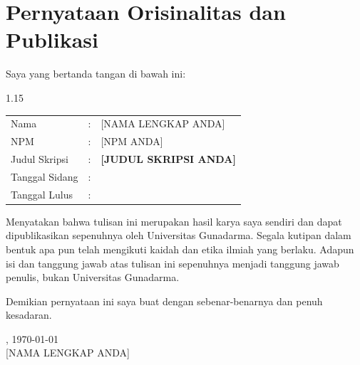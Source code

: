 \section*{Pernyataan Orisinalitas dan Publikasi}
\thispagestyle{plain}

\justify
Saya yang bertanda tangan di bawah ini:

\vspace{0.5cm}

\begin{spacing}{1.15}
	\begin{tabular}{p{4.5cm} cp{9cm}}
		Nama           & : & [NAMA LENGKAP ANDA]                                                                                                                           \\
		NPM            & : & [NPM ANDA]                                                                                                                                   \\
		Judul Skripsi  & : & \textbf{[JUDUL SKRIPSI ANDA]} \\
		Tanggal Sidang & : &                                                                                                                                            \\
		Tanggal Lulus  & : &                                                                                                                                            \\
	\end{tabular}
\end{spacing}

\vspace{0.5cm}

Menyatakan bahwa tulisan ini merupakan hasil karya saya sendiri dan dapat dipublikasikan sepenuhnya oleh Universitas Gunadarma. Segala kutipan dalam bentuk apa pun telah mengikuti kaidah dan etika ilmiah yang berlaku. Adapun isi dan tanggung jawab atas tulisan ini sepenuhnya menjadi tanggung jawab penulis, bukan Universitas Gunadarma.

Demikian pernyataan ini saya buat dengan sebenar-benarnya dan penuh kesadaran.

\vspace{1cm}

\begin{flushright}
	[Lokasi], \today\\[1.5cm]
	[NAMA LENGKAP ANDA]
\end{flushright}
